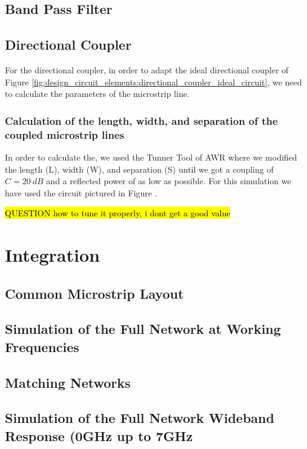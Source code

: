 \documentclass[12pt]{report} %
\newcommand{\question}[1]{\sethlcolor{red}\hl{QUESTION #1}}
\begin{document}
\section{Band Pass Filter}

\section{Directional Coupler}

For the directional coupler, in order to adapt the ideal directional coupler of Figure \ref{fig:design_circuit_elements:directional_coupler_ideal_circuit}, we need to calculate the parameters of the microstrip line.

\subsection{Calculation of the length, width, and separation of the coupled microstrip lines}

In order to calculate the, we used the Tunner Tool of AWR where we modified the length (L), width (W), and separation (S) until we got a coupling of $C = 20 \ dB$ and a reflected power of as low as possible. For this simulation we have used the circuit pictured in Figure .

\question{how to tune it properly, i dont get a good value}






\chapter{Integration}

\section{Common Microstrip Layout}

\section{Simulation of the Full Network at Working Frequencies}

\section{Matching Networks} %

\section{Simulation of the Full Network Wideband Response (0GHz up to 7GHz}
\end{document}
